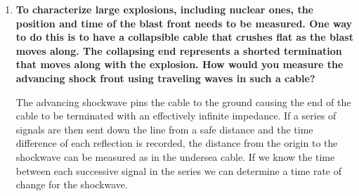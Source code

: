 \begin{enumerate}[resume]
\begin{enumerate}[label=\Alph*)]
\item {\bf To characterize large explosions, including nuclear ones, the position and time of the blast front needs to be measured. One way to do this is to have a collapsible cable that crushes flat as the blast moves along. The collapsing end represents a shorted termination that moves along with the explosion. How would you measure the advancing shock front using traveling waves in such a cable?}\newline

The advancing shockwave pins the cable to the ground causing the end of the cable to be terminated with an effectively infinite impedance. If a series of signals are then sent down the line from a safe distance and the time difference of each reflection is recorded, the distance from the origin to the shockwave can be measured as in the undersea cable. If we know the time between each successive signal in the series we can determine a time rate of change for the shockwave.

\end{enumerate}

\end{enumerate}



\AtEndDocument{\clearpage\ifodd\value{page}\else\null\clearpage\fi} %



